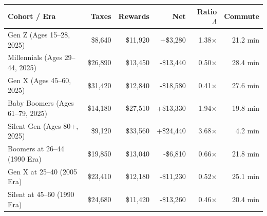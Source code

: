 \documentclass[11pt]{article}
\begin{document}
\begin{center}
\begin{tabular}{lrrrrr}
\hline
\textbf{Cohort / Era} & \textbf{Taxes} & \textbf{Rewards} & \textbf{Net} & \textbf{Ratio $\Lambda$} & \textbf{Commute} \\
\hline
Gen Z (Ages 15--28, 2025) & \$8,640 & \$11,920 & +\$3,280 & 1.38$\times$ & 21.2 min \\
Millennials (Ages 29--44, 2025) & \$26,890 & \$13,450 & -\$13,440 & 0.50$\times$ & 28.4 min \\
Gen X (Ages 45--60, 2025) & \$31,420 & \$12,840 & -\$18,580 & 0.41$\times$ & 27.6 min \\
Baby Boomers (Ages 61--79, 2025) & \$14,180 & \$27,510 & +\$13,330 & 1.94$\times$ & 19.8 min \\
Silent Gen (Ages 80+, 2025) & \$9,120 & \$33,560 & +\$24,440 & 3.68$\times$ & 4.2 min \\
Boomers at 26--44 (1990 Era) & \$19,850 & \$13,040 & -\$6,810 & 0.66$\times$ & 21.8 min \\
Gen X at 25--40 (2005 Era) & \$23,410 & \$12,180 & -\$11,230 & 0.52$\times$ & 25.1 min \\
Silent at 45--60 (1990 Era) & \$24,680 & \$11,420 & -\$13,260 & 0.46$\times$ & 20.4 min \\
\hline
\end{tabular}
\end{center}
\end{document}
